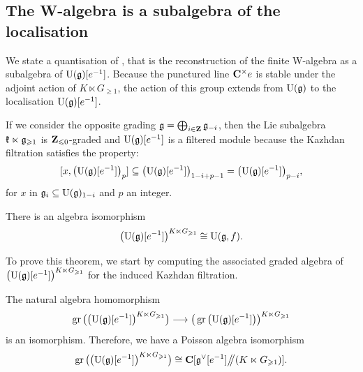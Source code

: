 \subsection{The W-algebra is a subalgebra of the localisation}

We state a quantisation of , that is the reconstruction of the finite W-algebra as a subalgebra of $\mathrm U(\mathfrak g)[e^{-1}]$. Because the punctured line $\mathbf{C}^\times e$ is stable under the adjoint action of $K \ltimes G_{\geqslant 1}$, the action of this group extends from $\mathrm U(\mathfrak g)$ to the localisation $\mathrm U(\mathfrak g)[e^{-1}]$.

If we consider the opposite grading $\mathfrak g = \bigoplus_{i \in \mathbf{Z}}\mathfrak g_{-i}$, then the Lie subalgebra $\mathfrak k \ltimes \mathfrak g_{\geqslant 1}$ is $\mathbf{Z}_{\leqslant 0}$-graded and $\mathrm U(\mathfrak g)[e^{-1}]$ is a filtered module because the Kazhdan filtration satisfies the property:
\[ [x, \big(\mathrm U(\mathfrak g)[e^{-1}]\big)_p] \subseteq \big(\mathrm U(\mathfrak g)[e^{-1}]\big)_{1 - i + p - 1} = \big(\mathrm U(\mathfrak g)[e^{-1}]\big)_{p - i}, \]
for $x$ in $\mathfrak g_i \subseteq \mathrm U(\mathfrak g)_{1 - i}$ and $p$ an integer.

\begin{theorem} \label{theorem:finite-w-algebra-coset}
	There is an algebra isomorphism
	\[ \big(\mathrm U(\mathfrak g)[e^{-1}]\big)^{K \ltimes G_{\geqslant 1}} \cong \mathrm U(\mathfrak g, f).  \]
\end{theorem}

To prove this theorem, we start by computing the associated graded algebra of $\big(\mathrm U(\mathfrak g)[e^{-1}]\big)^{K \ltimes G_{\geqslant 1}}$ for the induced Kazhdan filtration.

\begin{proposition} \label{proposition:gr-invariant-localisation}
	The natural algebra homomorphism
	\[ \operatorname{gr} \big(\big(\mathrm U(\mathfrak g)[e^{-1}]\big)^{K \ltimes G_{\geqslant 1}}\big) \longrightarrow \big(\operatorname{gr} \big(\mathrm U(\mathfrak g)[e^{-1}]\big)\big)^{K \ltimes G_{\geqslant 1}} \]
	is an isomorphism. Therefore, we have a Poisson algebra isomorphism
	\[ \operatorname{gr} \big(\big(\mathrm U(\mathfrak g)[e^{-1}]\big)^{K \ltimes G_{\geqslant 1}}\big) \cong \mathbf{C}[\mathfrak g^\vee[e^{-1}] \big/\!\!\big/ (K \ltimes G_{\geqslant 1})]. \]
\end{proposition}

